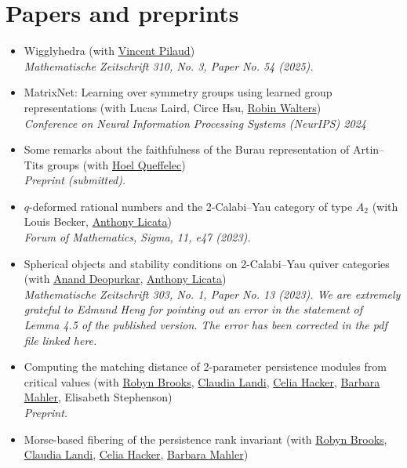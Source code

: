 \documentclass[a4paper]{moderncv}
\begin{document}
\section*{Papers and preprints}
\label{sec:orgb1602eb}
\begin{itemize}
\item Wigglyhedra (with \href{https://www.lix.polytechnique.fr/\~pilaud/}{Vincent Pilaud})\\
\emph{Mathematische Zeitschrift 310, No. 3, Paper No. 54 (2025).}
\item MatrixNet: Learning over symmetry groups using learned group representations (with Lucas Laird, Circe Hsu, \href{https://www.robinwalters.com/}{Robin Walters})\\
\emph{Conference on Neural Information Processing Systems (NeurIPS) 2024}
\item Some remarks about the faithfulness of the Burau representation of Artin--Tits groups (with \href{https://imag.umontpellier.fr/\~queffelec/}{Hoel Queffelec})\\
\emph{Preprint (submitted).}
\item \(q\)-deformed rational numbers and the 2-Calabi--Yau category of type \(A_{2}\) (with Louis Becker, \href{https://maths-people.anu.edu.au/\~licatat/Home.html}{Anthony Licata})\\
\emph{Forum of Mathematics, Sigma, 11, e47 (2023).}
\item Spherical objects and stability conditions on 2-Calabi--Yau quiver categories (with \href{https://deopurkar.github.io}{Anand Deopurkar}, \href{https://maths-people.anu.edu.au/\~licatat/Home.html}{Anthony Licata})\\
\emph{Mathematische Zeitschrift 303, No. 1, Paper No. 13 (2023). We are extremely grateful to Edmund Heng for pointing out an error in the statement of Lemma 4.5 of the published version. The error has been corrected in the pdf file linked here.}
\item Computing the matching distance of 2-parameter persistence modules from critical values (with \href{https://sites.google.com/view/robynkayebrooks/home}{Robyn Brooks}, \href{http://personale.unimore.it/Rubrica/Dettaglio/clandi}{Claudia Landi}, \href{https://people.epfl.ch/celia.hacker/?lang=en}{Celia Hacker}, \href{https://www.maths.ox.ac.uk/people/barbara.mahler}{Barbara Mahler}, Elisabeth Stephenson)\\
\emph{Preprint.}
\item Morse-based fibering of the persistence rank invariant (with \href{https://sites.google.com/view/robynkayebrooks/home}{Robyn Brooks}, \href{http://personale.unimore.it/Rubrica/Dettaglio/clandi}{Claudia Landi}, \href{https://people.epfl.ch/celia.hacker/?lang=en}{Celia Hacker}, \href{https://www.maths.ox.ac.uk/people/barbara.mahler}{Barbara Mahler})\\

\end{itemize}
\end{document}
